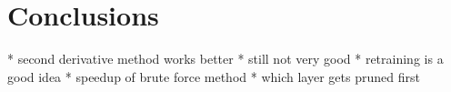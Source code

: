 \section{Conclusions}

* second derivative method works better
* still not very good
* retraining is a good idea
* speedup of brute force method
* which layer gets pruned first

\begin{equation}

\end{equation}